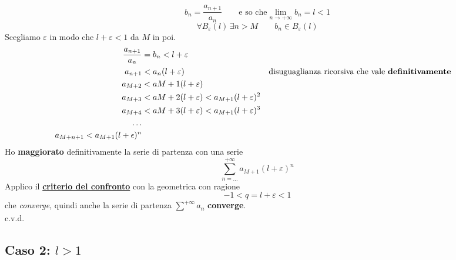 \documentclass[../dimostrazioni]{subfiles}
\begin{document}
                \[b_n = \frac{a_{n+1}}{a_n} \qquad \text{e so che} \lim_{n \to +\infty}b_n = l < 1 \] 
                \[\forall B_\varepsilon (l) \, \exists n > M \qquad b_n \in B_\varepsilon (l) \]
                Scegliamo \(\varepsilon\) in modo che \(l + \varepsilon < 1 \) da \(M\) in poi.
                \begin{align*}
                    \frac{a_{n+1}}{a_n} &= b_n < l + \varepsilon \\
                    a_{n+1} &< a_n(l + \varepsilon) && \text{disuguaglianza ricorsiva che vale \textbf{definitivamente}} \\
                    a_{M+2} &< a{M+1} (l + \varepsilon) \\
                    a_{M+3} &< a{M+2} (l + \varepsilon) < a_{M+1}(l + \varepsilon)^{2}\\
                    a_{M+4} &< a{M+3} (l + \varepsilon) < a_{M+1}(l + \varepsilon)^{3} \\
                    \qquad \dots \\
                    a_{M+n+1}< a_{M+1}(l + \epsilon)^{n}
                \end{align*}
                Ho \textbf{maggiorato} definitivamente la serie di partenza con una serie
                \[ \sum_{n=\dots}^{+\infty} a_{M+1}(l + \varepsilon)^{n}\] 
                Applico il \textbf{\hyperref[serieconfronto]{criterio del confronto}} con la geometrica con ragione
                \[-1 < q = l + \varepsilon < 1 \]
                che \emph{converge}, quindi anche la serie di partenza \(\sum_{}^{+\infty} a_n \) \textbf{converge}. \\
                c.v.d. 

            \subsection*{Caso 2: \(l > 1\)}




                        
\end{document}
